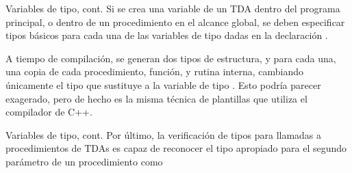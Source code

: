 
\begin{frame}{Variables de tipo, cont.}
Si se crea una variable de un TDA dentro del programa principal, o dentro de un procedimiento en el alcance global, se deben especificar tipos básicos para
cada una de las variables de tipo dadas en la declaración .

\typevarr

A tiempo de compilación, se generan dos tipos de estructura, y para cada una, 
una copia de cada procedimiento, función, y rutina interna, cambiando únicamente
el tipo que sustituye a la variable de tipo . Esto podría parecer 
exagerado, pero de hecho es la misma técnica de plantillas que utiliza el 
compilador de C++.
\end{frame}


\begin{frame}{Variables de tipo, cont.}
Por último, la verificación de tipos para llamadas a procedimientos de TDAs 
es capaz de reconocer el tipo apropiado para el segundo parámetro de un procedimiento como

\typevarrr
\end{frame}
